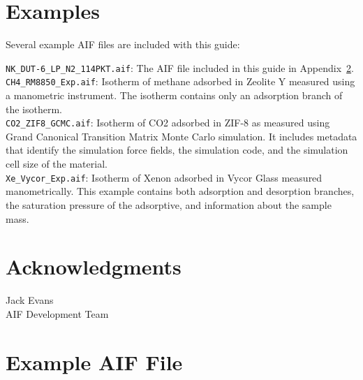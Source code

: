 \documentclass[preprint,pre,showkeys,12pt,superscriptaddress,nofootinbib,endfloats*]{revtex4-1}
\begin{document}
\section{Examples}

Several example AIF files are included with this guide:

\noindent \verb!NK_DUT-6_LP_N2_114PKT.aif!:  The AIF file included in this guide in Appendix~\ref{appendix:A}.\\

\noindent \verb!CH4_RM8850_Exp.aif!: Isotherm of methane adsorbed in Zeolite Y measured using a manometric instrument. The isotherm contains only an adsorption branch of the isotherm.\\

\noindent \verb!CO2_ZIF8_GCMC.aif!: Isotherm of CO2 adsorbed in ZIF-8 as measured using Grand Canonical Transition Matrix Monte Carlo simulation. It includes metadata that identify the simulation force fields, the simulation code, and the simulation cell size of the material.\\

\noindent \verb!Xe_Vycor_Exp.aif!: Isotherm of Xenon adsorbed in Vycor Glass measured manometrically. This example contains both adsorption and desorption branches, the saturation pressure of the adsorptive, and information about the sample mass.

\section*{Acknowledgments}
\noindent Jack Evans\\
AIF Development Team



\newpage
\appendix
\section{Example AIF File}\label{appendix:A}





%
\end{document}
